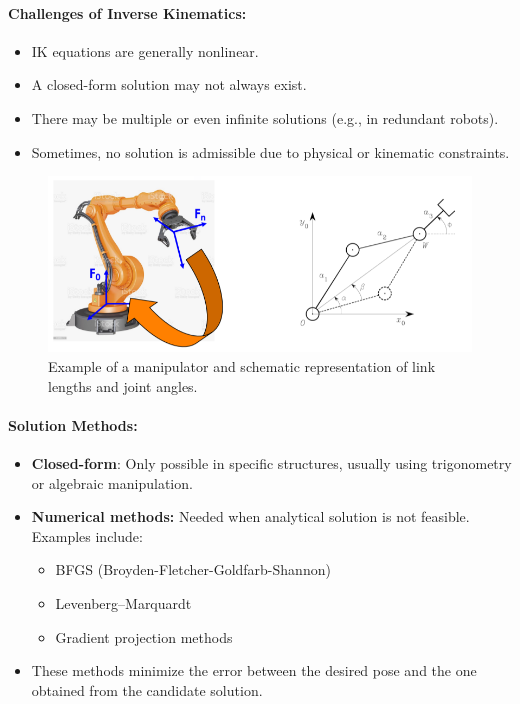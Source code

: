 \paragraph{Challenges of Inverse Kinematics:}
\begin{itemize}
  \item IK equations are generally nonlinear.
  \item A closed-form solution may not always exist.
  \item There may be multiple or even infinite solutions (e.g., in redundant robots).
  \item Sometimes, no solution is admissible due to physical or kinematic constraints.
\end{itemize}

\begin{figure}[H]
  \centering
  \includegraphics[width=0.8\linewidth]{imgs/ikine_robot_diagram.png}
  \caption{Example of a manipulator and schematic representation of link lengths and joint angles.}
\end{figure}

\paragraph{Solution Methods:}
\begin{itemize}
  \item \textbf{Closed-form}: Only possible in specific structures, usually using trigonometry or algebraic manipulation.
  \item \textbf{Numerical methods:} Needed when analytical solution is not feasible. Examples include:
  \begin{itemize}
    \item BFGS (Broyden-Fletcher-Goldfarb-Shannon)
    \item Levenberg–Marquardt
    \item Gradient projection methods
  \end{itemize}
  \item These methods minimize the error between the desired pose and the one obtained from the candidate solution.
\end{itemize}

